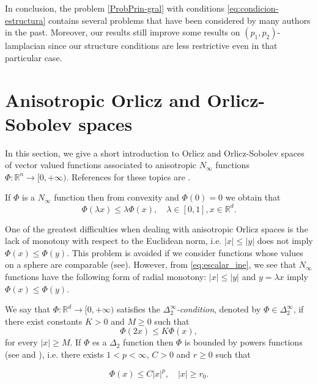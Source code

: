 \documentclass[twoside]{article}
\theoremstyle{remark}
\newcommand{\rr}{\mathbb{R}}
\renewcommand{\leq}{\leqslant}
\renewcommand{\geq}{\geqslant}
\begin{document}
In conclusion, the problem \eqref{ProbPrin-gral} with conditions \eqref{eq:condicion-estructura}  contains several problems that have been considered by many authors in the past. 
Moreover, our results still improve some results on $(p_1,p_2)$-lamplacian since our structure conditions are less restrictive even in that particular case. 

\section{Anisotropic Orlicz and Orlicz-Sobolev spaces}\label{preliminares}

In this section, we give a short introduction to  Orlicz and Orlicz-Sobolev spaces of vector valued functions associated to anisotropic $N_{\infty}$ functions $\Phi:\rr^n\to[0,+\infty)$.  References for  these topics are \cite{Desch2001,Orliczvectorial2005,Skaff1969,cianchi2000fully,cianchi2000local,chamra2017anisotropic,trudinger1974imbedding}.

If $\Phi$  is a $N_{\infty}$ function then from convexity and $\Phi(0)=0$ we obtain that
\begin{equation}\label{eq:escalar_ine}
 \Phi(\lambda x)\leq \lambda\Phi(x),\quad \lambda\in[0,1],x\in\rr^d.
\end{equation}

One of the greatest difficulties when dealing with anisotropic Orlicz spaces is the lack of  monotony  with respect to the Euclidean norm, i.e. $|x|\leq |y|$ does not imply $\Phi(x)\leq\Phi(y)$. This problem is avoided if we consider functions whose values on a sphere are comparable (see\cite{Skaff1969}). However, from \eqref{eq:escalar_ine}, we see that  $N_{\infty}$ functions have the following form of radial monotony: $|x|\leq |y|$ and $y=\lambda x$ imply $\Phi(x)\leq\Phi(y)$. 

We say that  $\Phi:\mathbb{R}^d\rightarrow [0,+\infty)$ satisfies the  \emph{$\Delta_2^{\infty}$-condition}, denoted by $\Phi \in \Delta_2^{\infty}$,
if there exist  constants $K>0$ and  $M\geq 0$ such that
\begin{equation}\label{delta2defi}\Phi(2x)\leq K \Phi(x),
\end{equation}
for every $|x|\geq M$. If $\Phi$ es a $\Delta_2$ function then $\Phi$ is bounded by powers functions (see \cite[Proof Lemma 2.4]{Desch2001} and \cite[Prop. 1]{cianchi2000local}), i.e. there exists $1<p<\infty$, $C>0$ and $r\geq 0$ such that

\[\Phi(x)\leq C|x|^p,\quad |x|\geq r_0.\] 
\end{document}
